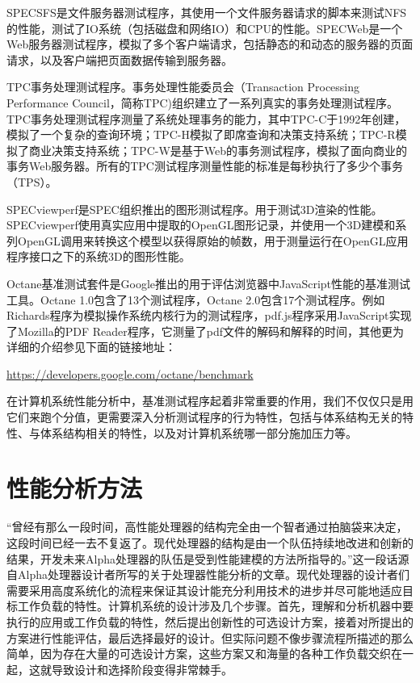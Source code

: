 \documentclass[]{ctexbook}
\begin{document}
SPECSFS是文件服务器测试程序，其使用一个文件服务器请求的脚本来测试NFS的性能，测试了IO系统（包括磁盘和网络IO）和CPU的性能。SPECWeb是一个Web服务器测试程序，模拟了多个客户端请求，包括静态的和动态的服务器的页面请求，以及客户端把页面数据传输到服务器。

TPC事务处理测试程序。事务处理性能委员会（Transaction Processing Performance Council，简称TPC)组织建立了一系列真实的事务处理测试程序。TPC事务处理测试程序测量了系统处理事务的能力，其中TPC-C于1992年创建，模拟了一个复杂的查询环境；TPC-H模拟了即席查询和决策支持系统；TPC-R模拟了商业决策支持系统；TPC-W是基于Web的事务测试程序，模拟了面向商业的事务Web服务器。所有的TPC测试程序测量性能的标准是每秒执行了多少个事务（TPS）。

SPECviewperf是SPEC组织推出的图形测试程序。用于测试3D渲染的性能。SPECviewperf使用真实应用中提取的OpenGL图形记录，并使用一个3D建模和系列OpenGL调用来转换这个模型以获得原始的帧数，用于测量运行在OpenGL应用程序接口之下的系统3D的图形性能。

Octane基准测试套件是Google推出的用于评估浏览器中JavaScript性能的基准测试工具。Octane 1.0包含了13个测试程序，Octane 2.0包含17个测试程序。例如Richards程序为模拟操作系统内核行为的测试程序，pdf.js程序采用JavaScript实现了Mozilla的PDF Reader程序，它测量了pdf文件的解码和解释的时间，其他更为详细的介绍参见下面的链接地址：

\url{https://developers.google.com/octane/benchmark}

在计算机系统性能分析中，基准测试程序起着非常重要的作用，我们不仅仅只是用它们来跑个分值，更需要深入分析测试程序的行为特性，包括与体系结构无关的特性、与体系结构相关的特性，以及对计算机系统哪一部分施加压力等。

\hypertarget{ux6027ux80fdux5206ux6790ux65b9ux6cd5}{%
\section{性能分析方法}\label{ux6027ux80fdux5206ux6790ux65b9ux6cd5}}

``曾经有那么一段时间，高性能处理器的结构完全由一个智者通过拍脑袋来决定，这段时间已经一去不复返了。现代处理器的结构是由一个队伍持续地改进和创新的结果，开发未来Alpha处理器的队伍是受到性能建模的方法所指导的。''这一段话源自Alpha处理器设计者所写的关于处理器性能分析的文章。现代处理器的设计者们需要采用高度系统化的流程来保证其设计能充分利用技术的进步并尽可能地适应目标工作负载的特性。计算机系统的设计涉及几个步骤。首先，理解和分析机器中要执行的应用或工作负载的特性，然后提出创新性的可选设计方案，接着对所提出的方案进行性能评估，最后选择最好的设计。但实际问题不像步骤流程所描述的那么简单，因为存在大量的可选设计方案，这些方案又和海量的各种工作负载交织在一起，这就导致设计和选择阶段变得非常棘手。
\end{document}
